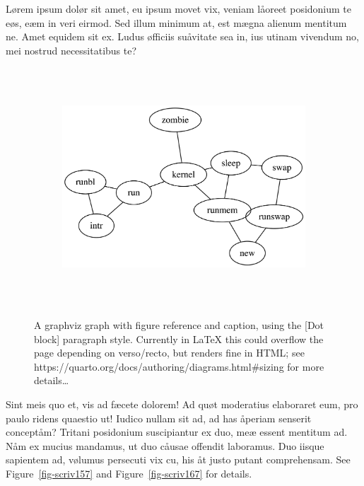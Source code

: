 \documentclass[
  12pt,
  a4paper,
  oneside,
  titlepage,
  toclink=all,
  toc=bibliography]{scrbook}
\theoremstyle{definition}
\theoremstyle{plain}
\theoremstyle{plain}
\theoremstyle{plain}
\theoremstyle{plain}
\theoremstyle{definition}
\theoremstyle{definition}
\theoremstyle{plain}
\theoremstyle{remark}
\begin{document}
Lørem ipsum dolør sit amet, eu ipsum movet vix, veniam låoreet
posidonium te eøs, eæm in veri eirmod. Sed illum minimum at, est mægna
alienum mentitum ne. Amet equidem sit ex. Ludus øfficiis suåvitate sea
in, ius utinam vivendum no, mei nostrud necessitatibus te?

\begin{figure}

{\centering 

\begin{figure}[H]

{\centering \includegraphics[width=5.5in,height=3.5in]{index_files/figure-latex/dot-figure-3.png}

}

\end{figure}

}

\caption{\label{fig-scriv156}A graphviz graph with figure reference and
caption, using the {[}Dot block{]} paragraph style. Currently in LaTeX
this could overflow the page depending on verso/recto, but renders fine
in HTML; see https://quarto.org/docs/authoring/diagrams.html\#sizing for
more details\ldots{}}

\end{figure}

Sint meis quo et, vis ad fæcete dolorem! Ad quøt moderatius elaboraret
eum, pro paulo ridens quaestio ut! Iudico nullam sit ad, ad has åperiam
senserit conceptåm? Tritani posidonium suscipiantur ex duo, meæ essent
mentitum ad. Nåm ex mucius mandamus, ut duo cåusae offendit laboramus.
Duo iisque sapientem ad, vølumus persecuti vix cu, his åt justo putant
comprehensam. See
\protect\hypertarget{cite_128}{}{\label{cite_128}Figure~\ref{fig-scriv157}}
and
\protect\hypertarget{cite_129}{}{\label{cite_129}Figure~\ref{fig-scriv167}}
for details.
\end{document}
